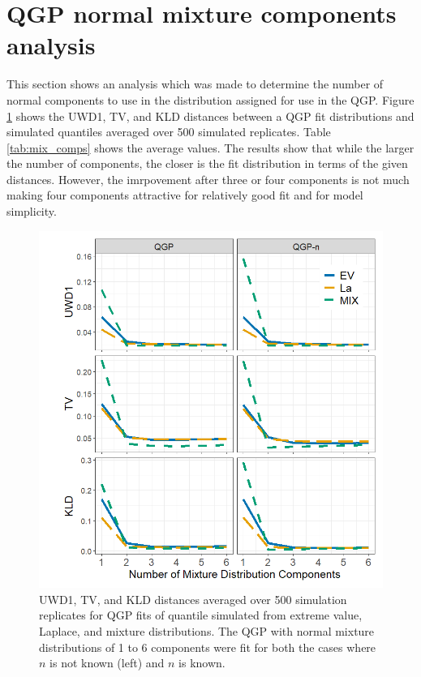 \documentclass[preprint,12pt,authoryear]{elsarticle}
\begin{document}
\newpage

\section*{QGP normal mixture components analysis}

This section shows an analysis which was made to determine the number of 
normal components to use in the distribution assigned for use in the QGP.
Figure \ref{fig:mix_comps} shows the UWD1, TV, and KLD distances between 
a QGP fit distributions and simulated quantiles averaged over 500 simulated
replicates. Table \ref{tab:mix_comps} shows the average values. The results 
show that while the larger the number of components, the closer is the fit 
distribution in terms of the given distances. However, the imrpovement after 
three or four components is not much making four components attractive 
for relatively good fit and for model simplicity.

\begin{figure}[hbt!]
\centering
  \includegraphics[width=.9\textwidth]{Images/mix_comps.png}
\caption{UWD1, TV, and KLD distances averaged over 500 simulation replicates
for QGP fits of quantile simulated from extreme value, Laplace, and
mixture distributions. The QGP with normal 
mixture distributions of 1 to 6 components were fit for both the cases where 
$n$ is not known (left) and $n$ is known.}
\label{fig:mix_comps}
\end{figure}
\end{document}
